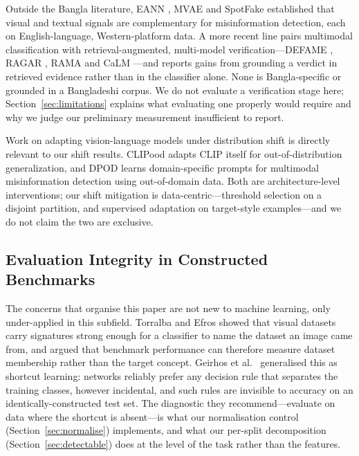 \documentclass[journal]{IEEEtran}
\begin{document}
Outside the Bangla literature, EANN \cite{eann}, MVAE \cite{mvae} and SpotFake
\cite{spotfake} established that visual and textual signals are complementary
for misinformation detection, each on English-language, Western-platform data.
A more recent line pairs multimodal classification with retrieval-augmented,
multi-model verification---DEFAME \cite{defame}, RAGAR \cite{ragar}, RAMA
\cite{rama} and CaLM \cite{calm}---and reports gains from grounding a verdict
in retrieved evidence rather than in the classifier alone. None is
Bangla-specific or grounded in a Bangladeshi corpus. We do not evaluate a
verification stage here; Section~\ref{sec:limitations} explains what
evaluating one properly would require and why we judge our preliminary
measurement insufficient to report.

Work on adapting vision-language models under distribution shift is directly
relevant to our shift results. CLIPood \cite{clipood} adapts CLIP itself for
out-of-distribution generalization, and DPOD \cite{dpod} learns
domain-specific prompts for multimodal misinformation detection using
out-of-domain data. Both are architecture-level interventions; our shift
mitigation is data-centric---threshold selection on a disjoint partition, and
supervised adaptation on target-style examples---and we do not claim the two
are exclusive.

\subsection{Evaluation Integrity in Constructed Benchmarks}
\label{sec:related-integrity}

The concerns that organise this paper are not new to machine learning, only
under-applied in this subfield. Torralba and Efros \cite{datasetbias} showed
that visual datasets carry signatures strong enough for a classifier to name
the dataset an image came from, and argued that benchmark performance can
therefore measure dataset membership rather than the target concept. Geirhos
et al.\ \cite{shortcut} generalised this as shortcut learning: networks
reliably prefer any decision rule that separates the training classes, however
incidental, and such rules are invisible to accuracy on an
identically-constructed test set. The diagnostic they recommend---evaluate on
data where the shortcut is absent---is what our normalisation control
(Section~\ref{sec:normalise}) implements, and what our per-split decomposition
(Section~\ref{sec:detectable}) does at the level of the task rather than the
features.
\end{document}
